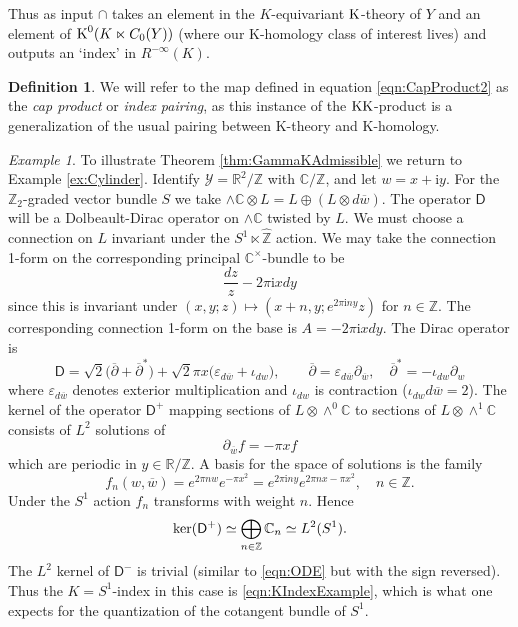 \documentclass[11pt,reqno]{amsart}
\theoremstyle{definition}
\newtheorem{definition}[theorem]{Definition}
\theoremstyle{remark}
\newtheorem{example}[theorem]{Example}
\newcommand{\ol}[1]{\overline{#1}}
\newcommand{\wh}[1]{\widehat{#1}}
\newcommand{\st}[1]{\mathsf{#1}}
\renewcommand{\i}{{\mathrm{i}}}
\def\Y{\ensuremath{\mathcal{Y}}}
\def\K{\ensuremath{\mathcal{K}}}
\def\bC{\ensuremath{\mathbb{C}}}
\def\bR{\ensuremath{\mathbb{R}}}
\def\bZ{\ensuremath{\mathbb{Z}}}
\def\ker{\ensuremath{\textnormal{ker}}}
\def\KK{\ensuremath{\textnormal{KK}}}
\def\K{\ensuremath{\textnormal{K}}}
\begin{document}
Thus as input $\cap$ takes an element in the $K$-equivariant $\K$-theory of $Y$ and an element of $\K^0(K\ltimes C_0(Y))$ (where our K-homology class of interest lives) and outputs an `index' in $R^{-\infty}(K)$.  
\begin{definition}
\label{def:CapProd}
We will refer to the map defined in equation \eqref{eqn:CapProduct2} as the \emph{cap product} or \emph{index pairing}, as this instance of the $\KK$-product is a generalization of the usual pairing between K-theory and K-homology.
\end{definition}

\begin{example}
To illustrate Theorem \ref{thm:GammaKAdmissible} we return to Example \ref{ex:Cylinder}.  Identify $\Y=\bR^2/\bZ$ with $\bC/\bZ$, and let $w=x+\i y$.  For the $\bZ_2$-graded vector bundle $S$ we take $\wedge \bC \otimes L=L \oplus (L\otimes d\ol{w})$.  The operator $\st{D}$ will be a Dolbeault-Dirac operator on $\wedge \bC$ twisted by $L$.  We must choose a connection on $L$ invariant under the $S^1 \ltimes \wh{\bZ}$ action.  We may take the connection 1-form on the corresponding principal $\bC^{\times}$-bundle to be
\[ \frac{dz}{z} - 2\pi \i x dy \]
since this is invariant under $(x,y;z)\mapsto (x+n,y;e^{2\pi \i ny}z)$ for $n \in \bZ$.  The corresponding connection 1-form on the base is $A=-2\pi \i xdy$.  The Dirac operator is
\[ \st{D}=\sqrt{2}\big(\ol{\partial}+\ol{\partial}^\ast\big) + \sqrt{2} \pi x\big(\varepsilon_{d\ol{w}}+\iota_{dw}\big), \qquad \ol{\partial}=\varepsilon_{d\ol{w}} \partial_{\ol{w}}, \quad \ol{\partial}^\ast=-\iota_{dw}\partial_w\]
where $\varepsilon_{d\ol{w}}$ denotes exterior multiplication and $\iota_{dw}$ is contraction ($\iota_{dw}d\ol{w}=2$).  The kernel of the operator $\st{D}^+$ mapping sections of $L \otimes \wedge^0\bC$ to sections of $L \otimes \wedge^1\bC$ consists of $L^2$ solutions of
\begin{equation} 
\label{eqn:ODE}
\partial_{\ol{w}} f=-\pi x f
\end{equation}
which are periodic in $y \in \bR/\bZ$.  A basis for the space of solutions is the family
\[ f_n(w,\ol{w})=e^{2\pi nw} e^{-\pi x^2}=e^{2\pi \i ny}e^{2\pi nx-\pi x^2}, \quad n \in \bZ. \]
Under the $S^1$ action $f_n$ transforms with weight $n$.  Hence
\begin{equation} 
\label{eqn:KIndexExample}
\ker(\st{D}^+) \simeq \bigoplus_{n \in \bZ} \bC_n \simeq L^2(S^1). 
\end{equation}
The $L^2$ kernel of $\st{D}^-$ is trivial (similar to \eqref{eqn:ODE} but with the sign reversed).  Thus the $K=S^1$-index in this case is \eqref{eqn:KIndexExample}, which is what one expects for the quantization of the cotangent bundle of $S^1$.
\end{example}
\end{document}
